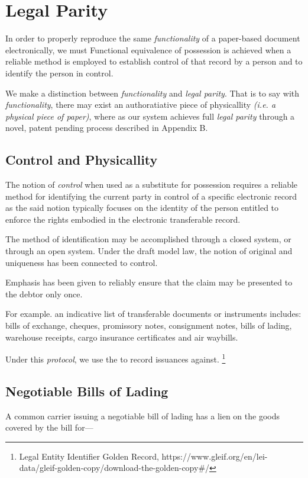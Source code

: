 
\section{Legal Parity}

	In order to properly reproduce the same \textit{functionality} of a paper-based document electronically, we must  Functional equivalence of possession is achieved when a reliable method is employed to establish control of that record by a person and to identify the person in control. 

  We make a distinction between \textit{functionality} and \textit{legal parity}. That is to say with \textit{functionality}, there may exist an authoratiative piece of physicallity \textit{(i.e. a physical piece of paper)}, where as our system achieves full \textit{legal parity} through a novel, patent pending process described in Appendix B. 

  \subsection{Control and Physicallity}

	The notion of \textit{control} when used as a substitute for possession requires a reliable method for identifying the current party in control of a specific electronic record as the said notion typically focuses on the identity of the person entitled to enforce the rights embodied in the electronic transferable record.

  The method of identification may be accomplished through a closed system, or through an open system. Under the draft model law, the notion of original and uniqueness has been connected to control. 

  Emphasis has been given to reliably ensure that the claim may be presented to the debtor only once. 

	For example. an indicative list of transferable documents or instruments includes: bills of exchange, cheques, promissory notes, consignment notes, bills of lading, warehouse receipts, cargo insurance certificates and air waybills.

  Under this \textit{protocol}, we use the  to record issuances against.
  \footnote{Legal Entity Identifier Golden Record, https://www.gleif.org/en/lei-data/gleif-golden-copy/download-the-golden-copy#/}

\subsection{Negotiable Bills of Lading}
A common carrier issuing a negotiable bill of lading has a lien on the goods covered by the bill for—

